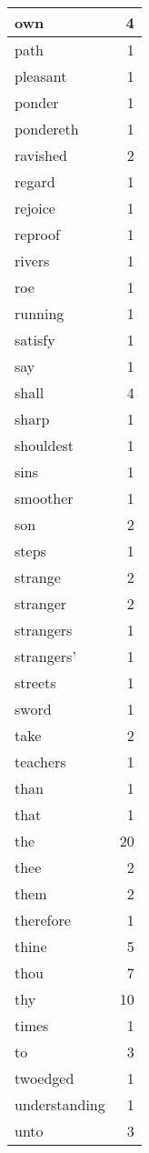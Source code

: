 \begin{center}
\begin{longtable}{l|r}
own & 4\\ \hline 
path & 1\\ \hline 
pleasant & 1\\ \hline 
ponder & 1\\ \hline 
pondereth & 1\\ \hline 
ravished & 2\\ \hline 
regard & 1\\ \hline 
rejoice & 1\\ \hline 
reproof & 1\\ \hline 
rivers & 1\\ \hline 
roe & 1\\ \hline 
running & 1\\ \hline 
satisfy & 1\\ \hline 
say & 1\\ \hline 
shall & 4\\ \hline 
sharp & 1\\ \hline 
shouldest & 1\\ \hline 
sins & 1\\ \hline 
smoother & 1\\ \hline 
son & 2\\ \hline 
steps & 1\\ \hline 
strange & 2\\ \hline 
stranger & 2\\ \hline 
strangers & 1\\ \hline 
strangers' & 1\\ \hline 
streets & 1\\ \hline 
sword & 1\\ \hline 
take & 2\\ \hline 
teachers & 1\\ \hline 
than & 1\\ \hline 
that & 1\\ \hline 
the & 20\\ \hline 
thee & 2\\ \hline 
them & 2\\ \hline 
therefore & 1\\ \hline 
thine & 5\\ \hline 
thou & 7\\ \hline 
thy & 10\\ \hline 
times & 1\\ \hline 
to & 3\\ \hline 
twoedged & 1\\ \hline 
understanding & 1\\ \hline 
unto & 3\\ \hline 

\end{longtable}
\end{center}
